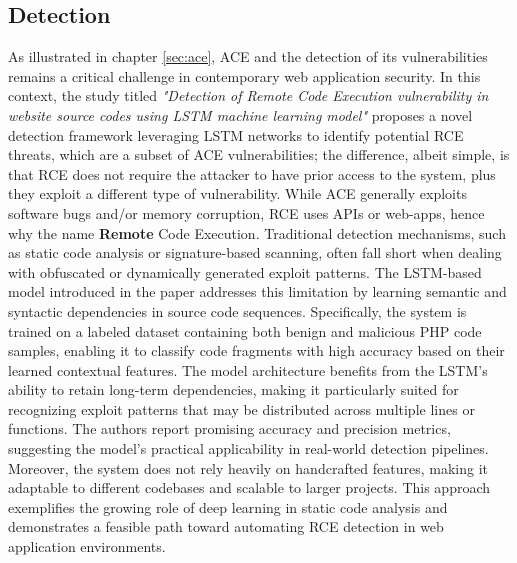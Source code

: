\documentclass[a4paper]{usiinfbachelorproject}
\begin{document}
\subsection{Detection}
\label{sec:today}

As illustrated in chapter \ref{sec:ace}, ACE and the detection of its vulnerabilities remains a critical challenge in contemporary web application security. In this context, the study titled \textit{"Detection of Remote Code Execution vulnerability in website source codes using LSTM machine learning model"} proposes a novel detection framework leveraging LSTM networks to identify potential RCE threats, which are a subset of ACE vulnerabilities; the difference, albeit simple, is that RCE does not require the attacker to have prior access to the system, plus they exploit a different type of vulnerability. While ACE generally exploits software bugs and/or memory corruption, RCE uses APIs or web-apps, hence why the name \textbf{Remote} Code Execution. Traditional detection mechanisms, such as static code analysis or signature-based scanning, often fall short when dealing with obfuscated or dynamically generated exploit patterns. The LSTM-based model introduced in the paper addresses this limitation by learning semantic and syntactic dependencies in source code sequences. Specifically, the system is trained on a labeled dataset containing both benign and malicious PHP code samples, enabling it to classify code fragments with high accuracy based on their learned contextual features. The model architecture benefits from the LSTM's ability to retain long-term dependencies, making it particularly suited for recognizing exploit patterns that may be distributed across multiple lines or functions. The authors report promising accuracy and precision metrics, suggesting the model's practical applicability in real-world detection pipelines. Moreover, the system does not rely heavily on handcrafted features, making it adaptable to different codebases and scalable to larger projects. This approach exemplifies the growing role of deep learning in static code analysis and demonstrates a feasible path toward automating RCE detection in web application environments.
\end{document}
